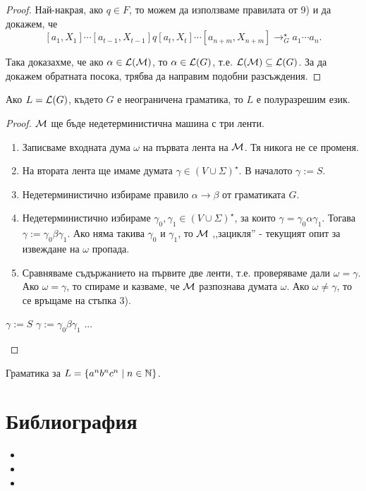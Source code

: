 \begin{proof}
  Най-накрая, ако $q \in F$, то можем да използваме правилата от 9) и да докажем, че
  \[[a_1,X_1]\cdots[a_{t-1},X_{t-1}]q[a_t,X_t]\cdots[a_{n+m},X_{n+m}] \rightarrow^\star_G a_1\cdots a_n.\]
  
  Така доказахме, че ако $\alpha \in \mathcal{L}(\mathcal{M})$, то $\alpha \in \mathcal{L}(G)$, т.е. $\mathcal{L}(\mathcal{M}) \subseteq \mathcal{L}(G)$.
  За да докажем обратната посока, трябва да направим подобни разсъждения.
\end{proof}

\begin{lemma}
  Ако $L = \mathcal{L}(G)$, където $G$ е неограничена граматика, то $L$ е полуразрешим език.
\end{lemma}
\begin{proof}
  $\mathcal{M}$ ще бъде недетерминистична машина с три ленти.
  \begin{enumerate}[1)]
  \item
    Записваме входната дума $\omega$ на първата лента на $\mathcal{M}$.
    Тя никога не се променя.
  \item
    На втората лента ще имаме думата $\gamma \in (V\cup\Sigma)^\star$.
    В началото $\gamma := S$.
  \item 
    Недетерминистично избираме правило $\alpha \to \beta$ от граматиката $G$.
  \item
    Недетерминистично избираме $\gamma_0,\gamma_1 \in (V\cup\Sigma)^\star$, за които 
    $\gamma = \gamma_0\alpha\gamma_1$.
    Тогава $\gamma := \gamma_0\beta\gamma_1$.
    Ако няма такива $\gamma_0$ и $\gamma_1$, то $\mathcal{M}$ ,,зацикля'' - текущият опит за извеждане на $\omega$ пропада.
  \item
    Сравняваме съдържанието на първите две ленти, т.е. проверяваме дали $\omega = \gamma$.
    Ако $\omega = \gamma$, то спираме и казваме, че $\mathcal{M}$ разпознава думата $\omega$.
    Ако $\omega \neq \gamma$, то се връщаме на стъпка 3).
  \end{enumerate}

  \begin{algorithm}[H]
  \caption{}
  \begin{algorithmic}[1]
    \State $\gamma:= S$
    \State $\gamma := \gamma_0\beta\gamma_1$
    \Else ...
    \EndIf
    \EndFor
  \end{algorithmic}
\end{algorithm}

\end{proof}

\begin{example}
  Граматика за $L = \{a^nb^nc^n \mid n\in\mathbb{N}\}$.
\end{example}


\section*{Библиография}

\begin{itemize}
\item 
\item
\item

\end{itemize}

